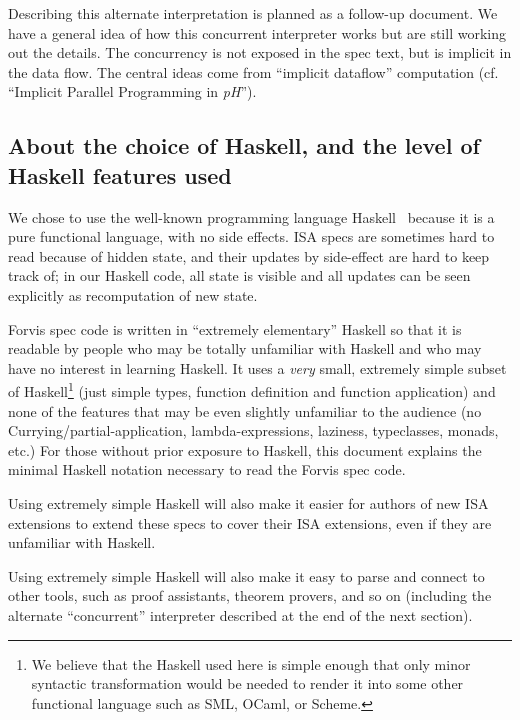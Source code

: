 \documentclass[11pt]{article}
\begin{document}
Describing this alternate interpretation is planned as a follow-up
document.  We have a general idea of how this concurrent interpreter
works but are still working out the details.  The concurrency is not
exposed in the spec text, but is implicit in the data flow.  The
central ideas come from ``implicit dataflow'' computation (cf.
``Implicit Parallel Programming in \emph{pH}''\cite{Nikhil2000a}).


\subsection{About the choice of Haskell, and the level of Haskell features used}

We chose to use the well-known programming language
Haskell~\cite{PeytonJones2003} because it is a pure functional
language, with no side effects.  ISA specs are sometimes hard to read
because of hidden state, and their updates by side-effect are hard to
keep track of; in our Haskell code, all state is visible and all
updates can be seen explicitly as recomputation of new state.

Forvis spec code is written in ``extremely elementary'' Haskell so
that it is readable by people who may be totally unfamiliar with
Haskell and who may have no interest in learning Haskell.  It uses a
\emph{very} small, extremely simple subset of Haskell\footnote{ We
believe that the Haskell used here is simple enough that only minor
syntactic transformation would be needed to render it into some other
functional language such as SML, OCaml, or Scheme.}  (just simple
types, function definition and function application) and none of the
features that may be even slightly unfamiliar to the audience (no
Currying/partial-application, lambda-expressions, laziness,
typeclasses, monads, etc.)  For those without prior exposure to
Haskell, this document explains the minimal Haskell notation necessary
to read the Forvis spec code.

Using extremely simple Haskell will also make it easier for authors of
new ISA extensions to extend these specs to cover their ISA
extensions, even if they are unfamiliar with Haskell.

Using extremely simple Haskell will also make it easy to parse and
connect to other tools, such as proof assistants, theorem provers, and
so on (including the alternate ``concurrent'' interpreter described at
the end of the next section).
\end{document}
